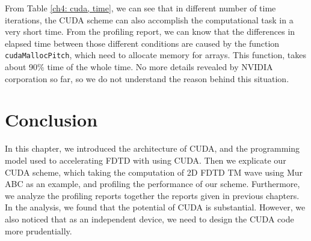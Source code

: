 From Table \ref{ch4: cuda, time}, we can see that in different number of time iterations, the CUDA scheme can also accomplish the computational task in a very short time. From the profiling report, we can know that the differences in elapsed time between those different conditions are caused by the function \lstinline|cudaMallocPitch|, which need to allocate memory for arrays. This function, takes about 90\% time of the whole time. No more details revealed by NVIDIA corporation so far, so we do not understand the reason behind this situation.

\section{Conclusion}

In this chapter, we introduced the architecture of CUDA, and the programming model used to accelerating FDTD with using CUDA. Then we explicate our CUDA scheme, which taking the computation of 2D FDTD TM wave using Mur ABC as an example, and profiling the performance of our scheme. Furthermore, we analyze the profiling reports together the reports given in previous chapters. In the analysis, we found that the potential of CUDA is substantial. However, we also noticed that as an independent device, we need to design the CUDA code more prudentially.